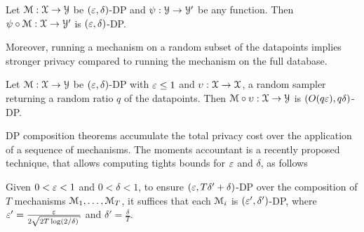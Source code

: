 	Let $ \mathcal{M}: \mathcal{X} \rightarrow \mathcal{Y}$ be $(\varepsilon, \delta)$-DP and $\psi:\mathcal{Y} \rightarrow \mathcal{Y}'$ be any function. Then $\psi \circ \mathcal{M}: \mathcal{X} \rightarrow \mathcal{Y}'$ is $(\varepsilon, \delta)$-DP.
	\label{prop:bdp-postprocessing}
\enprop

Moreover, running a mechanism on a random subset of the datapoints implies stronger privacy compared to running the mechanism on the full database.

Let $ \mathcal{M}: \mathcal{X} \rightarrow \mathcal{Y}$ be $(\varepsilon, \delta)$-DP with $\varepsilon \leq 1$ and $\upsilon: \mathcal{X} \rightarrow \mathcal{X}$, a random sampler returning a random ratio $q$ of the datapoints. Then $\mathcal{M} \circ \upsilon: \mathcal{X} \rightarrow \mathcal{Y}$ is $(O(q\varepsilon), q\delta)$-DP.
\label{prop:bdp-postprocessing}
\enprop

DP composition theorems accumulate the total privacy cost over the application of a sequence of mechanisms. The moments accountant is a recently proposed technique, that allows computing tights bounds for $\varepsilon$ and $\delta$, as follows

Given $0<\varepsilon<1$ and $0<\delta<1$, to ensure $(\varepsilon, T\delta'+\delta)$-DP over the composition of $T$ mechanisms $\mathcal{M}_1,\ldots,\mathcal{M}_T$, it suffices that each $\mathcal{M}_i$ is $(\varepsilon', \delta')$-DP, where $\veps'=\frac{\veps}{2\sqrt{2T\log(2/\delta)}}$ and $\delta'=\frac{\delta}{T}$. 
\label{prop:bmoments-accountant}
\enprop



